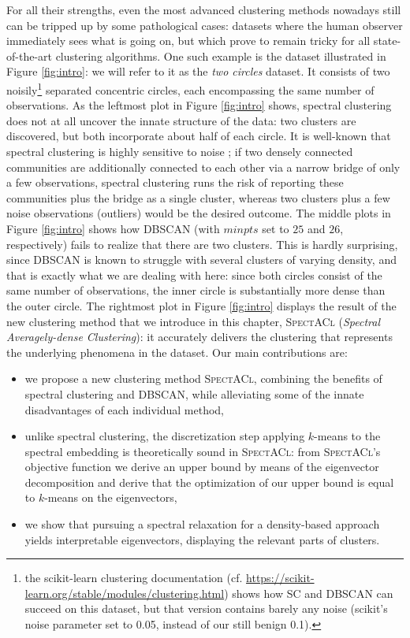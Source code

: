 For all their strengths, even the most advanced clustering methods nowadays still can be tripped up by some pathological cases: datasets where the human observer immediately sees what is going on, but which prove to remain tricky for all state-of-the-art clustering algorithms.  One such example is the dataset illustrated in Figure \ref{fig:intro}: we will refer to it as the \emph{two circles} dataset.  It consists of two noisily\footnote{the scikit-learn clustering documentation (cf. \url{https://scikit-learn.org/stable/modules/clustering.html}) shows how \textsc{SC} and DBSCAN can succeed on this dataset, but that version contains barely any noise (scikit's noise parameter set to 0.05, instead of our still benign 0.1).} separated concentric circles, each encompassing the same number of observations.  As the leftmost plot in Figure \ref{fig:intro} shows, spectral clustering does not at all uncover the innate structure of the data: two clusters are discovered, but both incorporate about half of each circle.  It is well-known that spectral clustering is highly sensitive to noise \cite[Figure 1]{bojchevski2017robust}; if
two densely connected communities are additionally connected to each other via a narrow bridge of only
a few observations, spectral clustering runs the risk of reporting these communities plus the bridge as
a single cluster, whereas two clusters plus a few noise observations (outliers) would be the desired 
outcome.
The middle plots in Figure \ref{fig:intro} shows how DBSCAN (with $minpts$ set to $25$ and $26$, respectively) fails to realize that there are two clusters. This is hardly surprising, since DBSCAN is known to struggle with several clusters of varying density, and that is exactly what we are dealing with here: since both circles consist of the same number of observations, the inner circle is substantially more dense than the outer circle.  The rightmost plot in Figure \ref{fig:intro} displays the result of the new clustering method that we introduce in this chapter, \textsc{SpectACl} (\emph{Spectral Averagely-dense Clustering}): it accurately delivers the clustering that represents the underlying phenomena in the dataset. Our main contributions are:
\begin{itemize}
    \item we propose a new clustering method \textsc{SpectACl}, combining the benefits of spectral clustering and DBSCAN, while alleviating some of the innate disadvantages of each individual method,
    \item unlike spectral clustering, the discretization step applying $k$-means to the spectral embedding is theoretically sound in \textsc{SpectACl}: from \textsc{SpectACl}'s objective function we derive an upper bound by means of the eigenvector decomposition and derive that the optimization of our upper bound is equal to $k$-means on the eigenvectors,
    \item we show that pursuing a spectral relaxation for a density-based approach yields interpretable eigenvectors, displaying the relevant parts of clusters.
\end{itemize}

